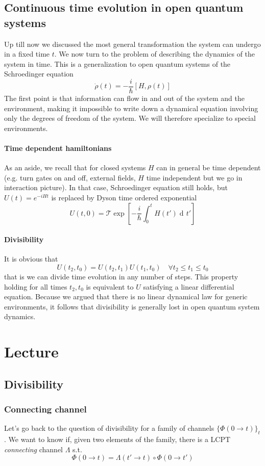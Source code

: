 \documentclass[a4paper, 11pt]{article}
\newcommand{\dd}{\mathop{\mathrm{d}\!}{}}
\begin{document}
	\subsection{Continuous time evolution in open quantum systems}
	Up till now we discussed the most general transformation the system can undergo in a fixed time $t$. We now turn to the problem of describing the dynamics of the system in time. This is a generalization to open quantum systems of the Schroedinger equation
	\[ \dot{\rho}(t) = -\frac{i}{\hbar} [H, \rho(t)] \]
	The first point is that information can flow in and out of the system and the environment, making it impossible to write down a dynamical equation involving only the degrees of freedom of the system. We will therefore specialize to special environments.
	
	\paragraph{Time dependent hamiltonians} As an aside, we recall that for closed systems $H$ can in general be time dependent (e.g. turn gates on and off, external fields, $H$ time independent but we go in interaction picture). In that case, Schroedinger equation still holds, but
	$U(t)=e^{-i H t}$ is replaced by Dyson time ordered exponential
	\[ U(t,0) = \mathcal{T}\exp\left[-\frac{i}{\hbar} \int_{0}^{t} H(t') \dd t' \right] \]
	
	\paragraph{Divisibility} It is obvious that
	\[ U(t_2, t_0) = U(t_2, t_1) U(t_1, t_0)\quad \forall t_2\le t_1 \le t_0 \]
	that is we can divide time evolution in any number of steps. This property holding for all times $t_2, t_0$ is equivalent to $U$ satisfying a linear differential equation. Because we argued that there is no linear dynamical law for generic environments, it follows that divisibility is generally lost in open quantum system dynamics.
	
	\section{Lecture}
	\subsection{Divisibility}
	\subsubsection{Connecting channel}
	Let's go back to the question of divisibility for a family of channels $\{\Phi(0\rightarrow t)\}_t$. We want to know if, given two elements of the family, there is a LCPT \emph{connecting} channel $\Lambda$ s.t.
	\[ \Phi(0\rightarrow t) = \Lambda(t'\rightarrow t) \circ \Phi(0\rightarrow t') \]
	
\end{document}
